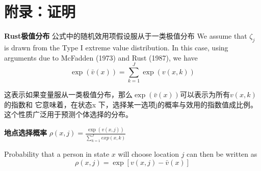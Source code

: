 \documentclass{article}
\numberwithin{equation}{section} %
\begin{document}
\section{附录：证明} %
\label{sec:附录_证明}
\textbf{Rust极值分布}
公式中的随机效用项假设服从于一类极值分布
We assume that $\zeta_j$ is drawn from the Type I extreme value distribution. In this case, using arguments due to McFadden (1973) and Rust (1987), we have
$$\exp\left(\bar{v}(x)\right) = \sum_{k=1}^J \exp\left(v(x, k)\right)$$

这表示如果变量服从一类极值分布，那么$\exp\left(\bar{v}(x)\right)$可以表示为所有$v(x, k)$的指数和
它意味着，在状态x 下，选择某一选项j的概率与效用的指数值成比例。
这个性质广泛用于预测个体选择的分布。

\textbf{地点选择概率}
$\rho(x,j)=\frac{\exp(v(x,j))}{\sum\limits_{k=1}^{J} exp(x,k)}$

Probability that a person in state $x$ will choose location $j$ can then be written as
$$\rho(x,j)=\exp[v(x,j)-\bar v(x)]$$
\end{document}
